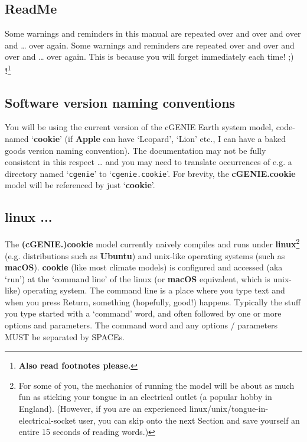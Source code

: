 \subsection*{ReadMe}

Some warnings and reminders in this manual are repeated over and over and over and … over again.
Some warnings and reminders are repeated over and over and over and … over again.
This is because you will forget immediately each time! ;)
\\\textbf{!}\footnote{\textbf{Also read footnotes please.}}


\subsection*{Software version naming conventions}

You will be using the current version of the cGENIE Earth system model, code-named ‘\textbf{cookie}’ (if \textbf{Apple} can have ‘Leopard’, ‘Lion’ etc., I can have a baked goods version naming convention). The documentation may not be fully consistent in this respect … and you may need to translate occurrences of e.g. a directory named ‘\texttt{cgenie}’ to ‘\texttt{cgenie.cookie}’. For brevity, the \textbf{cGENIE.cookie} model will be referenced by just ‘\textbf{cookie}’.


\subsection*{linux ...}

The \textbf{(cGENIE.)cookie} model currently naively compiles and runs under \textbf{linux}\footnote{For some of you, the mechanics of running the model will be about as much fun as sticking your tongue in an electrical outlet (a popular hobby in England). (However, if you are an experienced linux/unix/tongue-in-electrical-socket user, you can skip onto the next Section and save yourself an entire 15 seconds of reading words.)} (e.g. distributions such as \textbf{Ubuntu}) and unix-like operating systems (such as \textbf{macOS}). \textbf{cookie} (like most climate models) is configured and accessed (aka ‘run') at the ‘command line’ of the linux (or \textbf{macOS} equivalent, which is unix-like) operating system. The command line is a place where you type text and when you press \small\textsf{Return}\normalsize, something (hopefully, good!) happens. Typically the stuff you type started with a ‘command’ word, and often followed by one or more options and parameters. The command word and any options / parameters MUST be separated by SPACEs.

